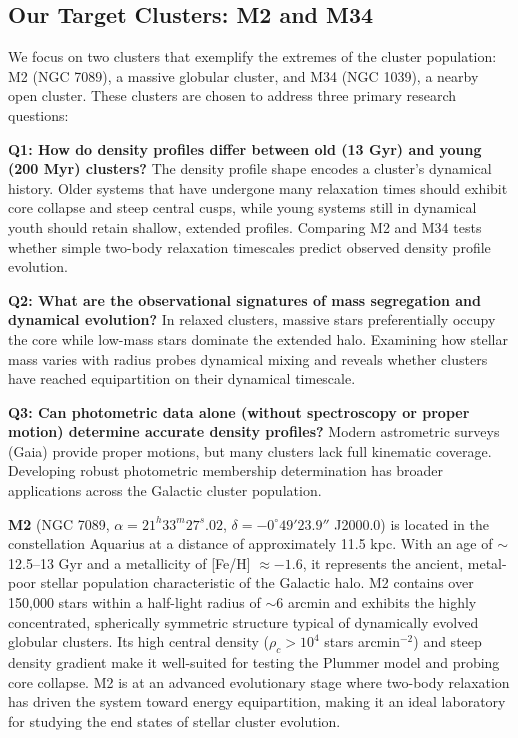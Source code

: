 \documentclass[linenumbers,trackchanges,twocolumn]{aastex701}
\begin{document}
\subsection{Our Target Clusters: M2 and M34}

We focus on two clusters that exemplify the extremes of the cluster population: M2 (NGC 7089), a massive globular cluster, and M34 (NGC 1039), a nearby open cluster. These clusters are chosen to address three primary research questions:

\textbf{Q1: How do density profiles differ between old (13 Gyr) and young (200 Myr) clusters?}
The density profile shape encodes a cluster's dynamical history. Older systems that have undergone many relaxation times should exhibit core collapse and steep central cusps, while young systems still in dynamical youth should retain shallow, extended profiles. Comparing M2 and M34 tests whether simple two-body relaxation timescales predict observed density profile evolution.

\textbf{Q2: What are the observational signatures of mass segregation and dynamical evolution?}
In relaxed clusters, massive stars preferentially occupy the core while low-mass stars dominate the extended halo. Examining how stellar mass varies with radius probes dynamical mixing and reveals whether clusters have reached equipartition on their dynamical timescale.

\textbf{Q3: Can photometric data alone (without spectroscopy or proper motion) determine accurate density profiles?}
Modern astrometric surveys (Gaia) provide proper motions, but many clusters lack full kinematic coverage. Developing robust photometric membership determination has broader applications across the Galactic cluster population.

\textbf{M2} (NGC 7089, $\alpha = 21^h 33^m 27^s.02$, $\delta = -0^\circ49'23.9''$ J2000.0) is located in the constellation Aquarius at a distance of approximately 11.5 kpc. With an age of $\sim$12.5--13 Gyr and a metallicity of [Fe/H] $\approx -1.6$, it represents the ancient, metal-poor stellar population characteristic of the Galactic halo. M2 contains over 150,000 stars within a half-light radius of $\sim$6 arcmin and exhibits the highly concentrated, spherically symmetric structure typical of dynamically evolved globular clusters. Its high central density ($\rho_c > 10^4$ stars arcmin$^{-2}$) and steep density gradient make it well-suited for testing the Plummer model and probing core collapse. M2 is at an advanced evolutionary stage where two-body relaxation has driven the system toward energy equipartition, making it an ideal laboratory for studying the end states of stellar cluster evolution.
\end{document}
